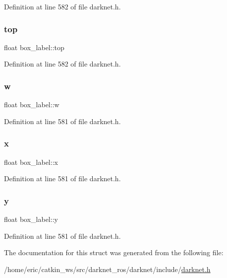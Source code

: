 Definition at line 582 of file darknet.\+h.

\mbox{\label{structbox__label_a1f60ec698e94e15cc51a2d5d9e07126c}} 
\subsubsection{\texorpdfstring{top}{top}}
{\footnotesize\ttfamily float box\+\_\+label\+::top}



Definition at line 582 of file darknet.\+h.

\mbox{\label{structbox__label_ad866cd941fd0704a6ab79c068d3b2aff}} 
\subsubsection{\texorpdfstring{w}{w}}
{\footnotesize\ttfamily float box\+\_\+label\+::w}



Definition at line 581 of file darknet.\+h.

\mbox{\label{structbox__label_a50bbc824640977cfbd11b7d129c488d3}} 
\subsubsection{\texorpdfstring{x}{x}}
{\footnotesize\ttfamily float box\+\_\+label\+::x}



Definition at line 581 of file darknet.\+h.

\mbox{\label{structbox__label_ae188dc93ed34cce2910afcd3b5e43730}} 
\subsubsection{\texorpdfstring{y}{y}}
{\footnotesize\ttfamily float box\+\_\+label\+::y}



Definition at line 581 of file darknet.\+h.



The documentation for this struct was generated from the following file\+:\begin{DoxyCompactItemize}
\item 
/home/eric/catkin\+\_\+ws/src/darknet\+\_\+ros/darknet/include/\mbox{\hyperlink{darknet_8h}{darknet.\+h}}\end{DoxyCompactItemize}
